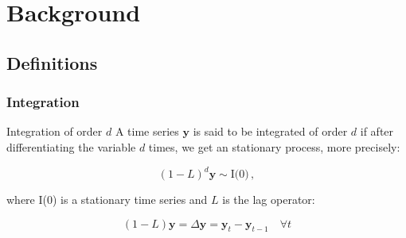 \documentclass[xcolor=dvipsnames]{beamer}
\begin{document}
\section{Background}
\subsection{Definitions}
\begin{frame}
\frametitle{Integration }
\begin{block}{Integration of order $d$}
A time series $\mathbf{y}$ is said to be integrated of order $d$ if after
differentiating the variable $d$ times, we get an stationary process, more precisely:

\[
(1-L)^d \mathbf{y} \sim \text{I(0)} \, ,
\]

\noindent where I(0) is a stationary time series and $L$ is the lag operator:

\[
(1-L)\mathbf{y} = \Delta \mathbf{y}=\mathbf{y}_t  -\mathbf{y}_{t-1} \quad \forall t
\]
\end{block}
\end{frame}
\end{document}
